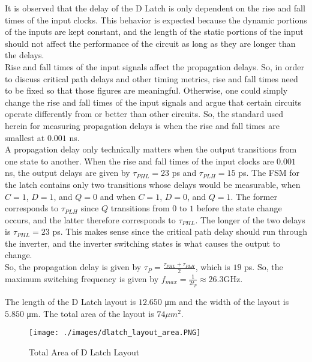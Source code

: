 \FloatBarrier

It is observed that the delay of the D Latch is only dependent on the rise and fall times of the input clocks.
This behavior is expected because the dynamic portions of the inputs are kept constant, and the length of the static portions of the input should not affect the performance of the circuit as long as they are longer than the delays. \\

Rise and fall times of the input signals affect the propagation delays.
So, in order to discuss critical path delays and other timing metrics, rise and fall times need to be fixed so that those figures are meaningful.
Otherwise, one could simply change the rise and fall times of the input signals and argue that certain circuits operate differently from or better than other circuits.
So, the standard used herein for measuring propagation delays is when the rise and fall times are smallest at $0.001$ \si{\nano\second}. \\

A propagation delay only technically matters when the output transitions from one state to another.
When the rise and fall times of the input clocks are $0.001$ \si{\nano\second}, the output delays are given by $\tau_{PHL} = 23$ \si{\pico\second} and $\tau_{PLH} = 15$ \si{\pico\second}.
The FSM for the latch contains only two transitions whose delays would be measurable, when $C = 1$, $D = 1$, and $Q = 0$ and when $C = 1$, $D = 0$, and $Q = 1$.
The former corresponds to $\tau_{PLH}$ since $Q$ transitions from $0$ to $1$ before the state change occurs, and the latter therefore corresponds to $\tau_{PHL}$. The longer of the two delays is $\tau_{PHL} = 23$ \si{\pico\second}.
This makes sense since the critical path delay should run through the inverter, and the inverter switching states is what causes the output to change. \\

So, the propagation delay is given by $\tau_{P} = \frac{ \tau_{PHL} + \tau_{PLH} }{ 2 }$, which is $19$ \si{\pico\second}. So, the maximum switching frequency is given by $f_{max} = \frac{1}{2 t_{p}} \approx 26.3$\si{\giga\hertz}.

The length of the D Latch layout is $12.650$ \si{\micro\meter} and the width of the layout is $5.850$ \si{\micro\meter}. The total area of the layout is $74 \mu m^2$.

\FloatBarrier

\begin{figure}[h!]
	\centering
	\texttt{[image: ./images/dlatch\_layout\_area.PNG]}
	\caption{Total Area of D Latch Layout}
	\label{fig:dlatch_area}
\end{figure}

